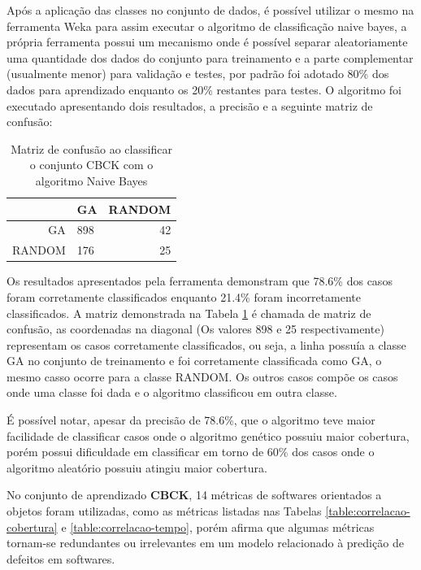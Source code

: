 \documentclass[
	12pt,				%
	oneside,			%
	a4paper,			%
	english,			%
	brazil				%
	]{abntex2ppgsi}
\begin{document}
Após a aplicação das classes no conjunto de dados, é possível utilizar o mesmo na ferramenta Weka para assim executar o algoritmo de classificação naive bayes, a própria ferramenta possui um mecanismo onde é possível separar aleatoriamente uma quantidade dos dados do conjunto para treinamento e a parte complementar (usualmente menor) para validação e testes, por padrão foi adotado 80\% dos dados para aprendizado enquanto os 20\% restantes para testes. O algoritmo foi executado apresentando dois resultados, a precisão e a seguinte matriz de confusão:

\begin{table}[h]
\centering
\caption{Matriz de confusão ao classificar o conjunto CBCK com o algoritmo Naive Bayes}
\vspace{0.5cm}
\begin{tabular}{r|lr}

										
 & GA & RANDOM \\ %
\hline                               %
GA		& 898		& 42 \\
RANDOM		& 176		& 25
\end{tabular}
\label{table:confusao-CBCK}
\end{table}

Os resultados apresentados pela ferramenta demonstram que 78.6\% dos casos foram corretamente classificados enquanto 21.4\% foram incorretamente classificados. A matriz demonstrada na Tabela \ref{table:confusao-CBCK} é chamada de matriz de confusão, as coordenadas na diagonal (Os valores 898 e 25 respectivamente) representam os casos corretamente classificados, ou seja, a linha possuía a classe GA no conjunto de treinamento e foi corretamente classificada como GA, o mesmo casso ocorre para a classe RANDOM. Os outros casos compõe os casos onde uma classe foi dada e o algoritmo classificou em outra classe.

É possível notar, apesar da precisão de 78.6\%, que o algoritmo teve maior facilidade de classificar casos onde o algoritmo genético possuiu maior cobertura, porém possui dificuldade em classificar em torno de 60\% dos casos onde o algoritmo aleatório possuiu atingiu maior cobertura.

No conjunto de aprendizado \textbf{CBCK}, 14 métricas de softwares orientados a objetos foram utilizadas, como as métricas listadas nas Tabelas  \ref{table:correlacao-cobertura} e \ref{table:correlacao-tempo}, porém \cite{Xia2013} afirma que algumas métricas tornam-se redundantes ou irrelevantes em um modelo relacionado à predição de defeitos em softwares.
\end{document}
